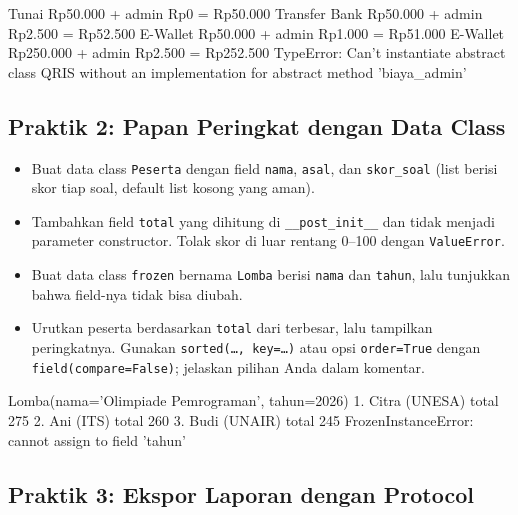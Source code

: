 \begin{keluaran}
Tunai         Rp50.000 + admin Rp0     = Rp50.000
Transfer Bank Rp50.000 + admin Rp2.500 = Rp52.500
E-Wallet      Rp50.000 + admin Rp1.000 = Rp51.000
E-Wallet      Rp250.000 + admin Rp2.500 = Rp252.500
TypeError: Can't instantiate abstract class QRIS without an implementation for abstract method 'biaya_admin'
\end{keluaran}

\subsection{Praktik 2: Papan Peringkat dengan Data Class}

\begin{itemize}
  \item Buat data class \texttt{Peserta} dengan field \texttt{nama}, \texttt{asal}, dan \texttt{skor\_soal} (list berisi skor tiap soal, default list kosong yang aman).
  \item Tambahkan field \texttt{total} yang dihitung di \texttt{\_\_post\_init\_\_} dan tidak menjadi parameter constructor. Tolak skor di luar rentang 0--100 dengan \texttt{ValueError}.
  \item Buat data class \texttt{frozen} bernama \texttt{Lomba} berisi \texttt{nama} dan \texttt{tahun}, lalu tunjukkan bahwa field-nya tidak bisa diubah.
  \item Urutkan peserta berdasarkan \texttt{total} dari terbesar, lalu tampilkan peringkatnya. Gunakan \texttt{sorted(\ldots, key=\ldots)} atau opsi \texttt{order=True} dengan \texttt{field(compare=False)}; jelaskan pilihan Anda dalam komentar.
\end{itemize}

\begin{keluaran}
Lomba(nama='Olimpiade Pemrograman', tahun=2026)
1. Citra  (UNESA)  total 275
2. Ani    (ITS)    total 260
3. Budi   (UNAIR)  total 245
FrozenInstanceError: cannot assign to field 'tahun'
\end{keluaran}

\subsection{Praktik 3: Ekspor Laporan dengan Protocol}

